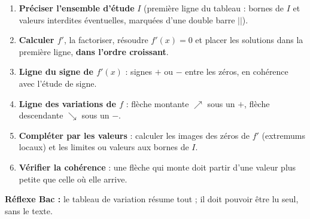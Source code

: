 \documentclass[11pt]{article}
\begin{document}
\begin{methode}
\begin{enumerate}
\item \textbf{Préciser l'ensemble d'étude} $I$ (première ligne du tableau : bornes de $I$ et valeurs interdites éventuelles, marquées d'une double barre $||$).
\item \textbf{Calculer $f'$}, la factoriser, résoudre $f'(x)=0$ et placer les solutions dans la première ligne, \textbf{dans l'ordre croissant}.
\item \textbf{Ligne du signe de $f'(x)$} : signes $+$ ou $-$ entre les zéros, en cohérence avec l'étude de signe.
\item \textbf{Ligne des variations de $f$} : flèche montante $\nearrow$ sous un $+$, flèche descendante $\searrow$ sous un $-$.
\item \textbf{Compléter par les valeurs} : calculer les images des zéros de $f'$ (extremums locaux) et les limites ou valeurs aux bornes de $I$.
\item \textbf{Vérifier la cohérence} : une flèche qui monte doit partir d'une valeur plus petite que celle où elle arrive.
\end{enumerate}
\textbf{Réflexe Bac :} le tableau de variation résume tout ; il doit pouvoir être lu seul, sans le texte.
\end{methode}
\end{document}
